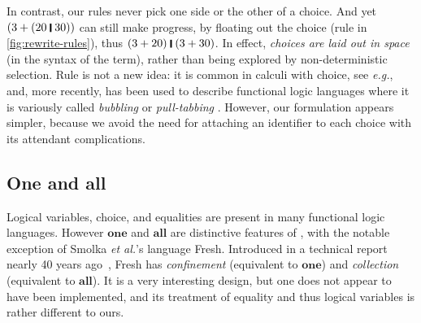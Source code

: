 \documentclass[acmsmall,review,anonymous,dvipsnames]{acmart}
\newcommand{\eg}{\emph{e.g.}}
\newcommand{\etal}{\emph{et al.}}
\begin{document}
In contrast, our rules never pick one side or the other of a choice.
And yet \ensuremath{(\mathrm{3}\mathbin{+}(\mathrm{20}\;\rule[-0.3mm]{0.5mm}{2.5mm}\;\mathrm{30}))} can still make progress, by floating out the
choice (rule  in \cref{fig:rewrite-rules}), thus
\ensuremath{(\mathrm{3}\mathbin{+}\mathrm{20})\;\rule[-0.3mm]{0.5mm}{2.5mm}\;(\mathrm{3}\mathbin{+}\mathrm{30})}.
In effect, \emph{choices are laid out in space} (in
the syntax of the term), rather than being explored by
non-deterministic selection.  Rule  is not a new idea:
it is common in calculi with choice, see {\eg}, ~\citetext{\citealp[Section 6.1]{liguoro:non-det}, \citealp[Section 3]{lago:probabilistic}}
and, more recently, has been used to describe functional logic languages where it is variously
called \emph{bubbling} \cite{antoy:bubbling} or \emph{pull-tabbing} \cite{antoy:pull-tabbing}.
However, our formulation appears simpler, because we avoid the need for attaching
an identifier to each choice with its attendant complications.

\subsection{One and all}

Logical variables, choice, and equalities are present in many functional logic
languages.  However \ensuremath{\textbf{one}} and \ensuremath{\textbf{all}} are distinctive features of \versecalc{},
with the notable exception of Smolka {\etal}'s language Fresh.
Introduced in a technical report nearly 40 years ago~\cite{smolka:fresh},
Fresh has \emph{confinement} (equivalent to \ensuremath{\textbf{one}}) and \emph{collection} (equivalent to \ensuremath{\textbf{all}}).
It is a very interesting design, but one does not appear to have been implemented,
and its treatment of equality and thus logical variables is rather different to ours.
\end{document}
